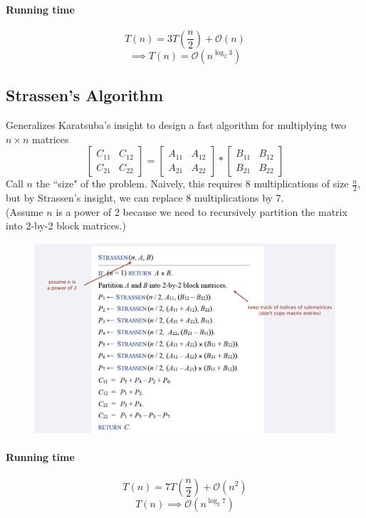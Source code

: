 \documentclass[11pt]{article}
\begin{document}
\paragraph{Running time}
$$T(n) = 3T(\frac{n}{2}) + \mathcal{O}(n)$$
$$\implies T(n) = \mathcal{O}(n^{\log_2{3}})$$

\subsection{Strassen's Algorithm}
Generalizes Karatsuba's insight to design a fast algorithm for multiplying two $n \times n$ matrices
$$ \begin{bmatrix} C_{11} & C_{12} \\
C_{21} & C_{22}
\end{bmatrix} 
= \begin{bmatrix} A_{11} & A_{12} \\
A_{21} & A_{22}
\end{bmatrix} * \begin{bmatrix} B_{11} & B_{12} \\
B_{21} & B_{22}
\end{bmatrix}$$
Call $n$ the ``size" of the problem. Naively, this requires 8 multiplications of size $\frac{n}{2}$, but by Strassen's insight, we can replace 8 multiplications by 7.\\
(Assume $n$ is a power of 2 because we need to recursively partition the matrix into 2-by-2 block matrices.)
\begin{figure}[h]
	\centering
	\includegraphics[scale=0.6]{p4}
\end{figure}

\paragraph{Running time}
$$T(n) = 7T(\frac{n}{2}) + \mathcal{O}(n^2)$$
$$T(n) \implies \mathcal{O}(n^{\log_2 7})$$
\end{document}
